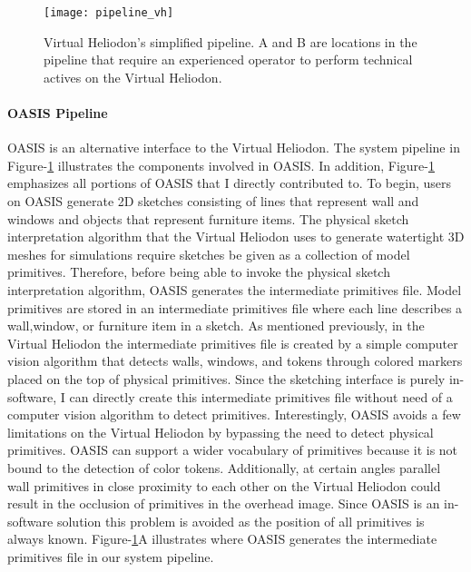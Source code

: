   		\begin{figure}[h]
			\centering
			\texttt{[image: pipeline\_vh]}
			\caption{Virtual Heliodon's simplified pipeline. A and B are locations in the pipeline that require an experienced operator to perform technical actives on the Virtual Heliodon. }
			\label{fig:new_pipeline}
			\end{figure}

		\paragraph{OASIS Pipeline}
			OASIS is an alternative interface to the Virtual Heliodon. 
			The system pipeline in Figure-\ref{fig:new_pipeline} illustrates the components involved in OASIS.
			In addition, Figure-\ref{fig:new_pipeline} emphasizes all portions of OASIS that I directly contributed to.
			To begin, users on OASIS generate 2D sketches consisting of lines that represent wall and windows and objects that represent furniture items.
			The physical sketch interpretation algorithm that the Virtual Heliodon uses to generate watertight 3D meshes for simulations require sketches be given as a collection of model primitives. 
			Therefore, before being able to invoke the physical sketch interpretation algorithm, OASIS generates the intermediate primitives file.
			Model primitives are stored in an intermediate primitives file where each line describes a wall,window, or furniture item in a sketch.
			As mentioned previously, in the Virtual Heliodon the intermediate primitives file is created by a simple computer vision algorithm that detects walls, windows, and tokens through colored markers placed on the top of physical primitives.
			Since the sketching interface is purely in-software, I can directly create this intermediate primitives file without need of a computer vision algorithm to detect primitives.
			Interestingly, OASIS avoids a few limitations on the Virtual Heliodon by bypassing the need to detect physical primitives. 
			OASIS can support a wider vocabulary of primitives because it is not bound to the detection of color tokens.
			Additionally, at certain angles parallel wall primitives in close proximity to each other on the Virtual Heliodon could result in the occlusion of primitives in the overhead image. 
			Since OASIS is an in-software solution this problem is avoided as the position of all primitives is always known.
			Figure-\ref{fig:new_pipeline}A illustrates where OASIS generates the intermediate primitives file in our system pipeline.
